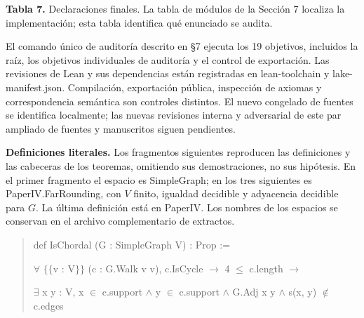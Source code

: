 \documentclass[spanish,11pt,a4paper]{article}
\begin{document}
\textbf{Tabla 7.} Declaraciones finales. La tabla de módulos de la Sección 7 localiza la implementación; esta tabla identifica qué enunciado se audita.

El comando único de auditoría descrito en §7 ejecuta los 19 objetivos, incluidos la raíz, los objetivos individuales de auditoría y el control de exportación. Las revisiones de Lean y sus dependencias están registradas en lean-toolchain y lake-manifest.json. Compilación, exportación pública, inspección de axiomas y correspondencia semántica son controles distintos. El nuevo congelado de fuentes se identifica localmente; las nuevas revisiones interna y adversarial de este par ampliado de fuentes y manuscritos siguen pendientes.

\textbf{Definiciones literales.} Los fragmentos siguientes reproducen las definiciones y las cabeceras de los teoremas, omitiendo sus demostraciones, no sus hipótesis. En el primer fragmento el espacio es {\ttfamily\small SimpleGraph}; en los tres siguientes es {\ttfamily\small PaperIV.\discretionary{\hbox{\ensuremath{\hookrightarrow}}}{}{}FarRounding}, con \(V\) finito, igualdad decidible y adyacencia decidible para \(G\). La última definición está en {\ttfamily\small PaperIV}. Los nombres de los espacios se conservan en el archivo complementario de extractos.

\begin{quote}\footnotesize\ttfamily\raggedright
def IsChordal (G : SimpleGraph V) : Prop :=\par
  \(\forall\) \(\{\!\{\)v : V\(\}\!\}\) (c : G.Walk v v), c.IsCycle \(\to\) 4 \(\le\) c.length \(\to\)\par
    \(\exists\) x y : V, x \(\in\) c.support \(\land\) y \(\in\) c.support \(\land\) G.Adj x y \(\land\) s(x, y) \(\notin\) c.edges\par
\end{quote}
\end{document}
